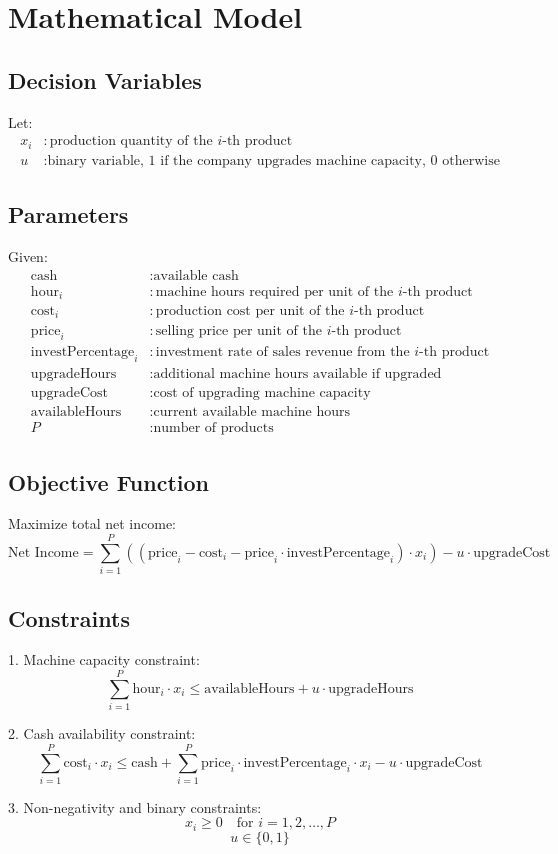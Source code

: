 \documentclass{article}
\begin{document}
\section*{Mathematical Model}

\subsection*{Decision Variables}

Let:
\begin{align*}
x_i & : \text{production quantity of the } i\text{-th product} \\
u & : \text{binary variable, 1 if the company upgrades machine capacity, 0 otherwise}
\end{align*}

\subsection*{Parameters}

Given:
\begin{align*}
\text{cash} & : \text{available cash} \\
\text{hour}_i & : \text{machine hours required per unit of the } i\text{-th product} \\
\text{cost}_i & : \text{production cost per unit of the } i\text{-th product} \\
\text{price}_i & : \text{selling price per unit of the } i\text{-th product} \\
\text{investPercentage}_i & : \text{investment rate of sales revenue from the } i\text{-th product} \\
\text{upgradeHours} & : \text{additional machine hours available if upgraded} \\
\text{upgradeCost} & : \text{cost of upgrading machine capacity} \\
\text{availableHours} & : \text{current available machine hours} \\
P & : \text{number of products}
\end{align*}

\subsection*{Objective Function}

Maximize total net income:
\[
\text{Net Income} = \sum_{i=1}^{P} \left( (\text{price}_i - \text{cost}_i - \text{price}_i \cdot \text{investPercentage}_i) \cdot x_i \right) - u \cdot \text{upgradeCost}
\]

\subsection*{Constraints}

1. Machine capacity constraint:
\[
\sum_{i=1}^{P} \text{hour}_i \cdot x_i \leq \text{availableHours} + u \cdot \text{upgradeHours}
\]

2. Cash availability constraint:
\[
\sum_{i=1}^{P} \text{cost}_i \cdot x_i \leq \text{cash} + \sum_{i=1}^{P} \text{price}_i \cdot \text{investPercentage}_i \cdot x_i - u \cdot \text{upgradeCost}
\]

3. Non-negativity and binary constraints:
\[
x_i \geq 0 \quad \text{for } i = 1, 2, \ldots, P
\]
\[
u \in \{0, 1\}
\]
\end{document}
